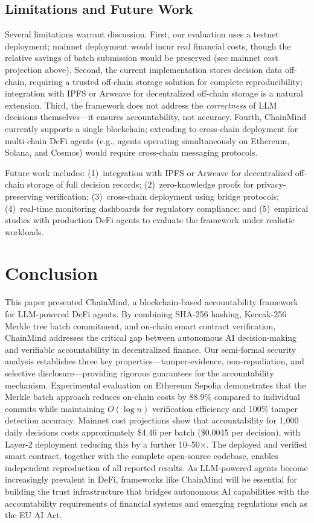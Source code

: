 \documentclass[manuscript,nonacm]{acmart}
\begin{document}
\subsection{Limitations and Future Work}

Several limitations warrant discussion.
First, our evaluation uses a testnet deployment; mainnet deployment would incur real financial costs, though the relative savings of batch submission would be preserved (see mainnet cost projection above).
Second, the current implementation stores decision data off-chain, requiring a trusted off-chain storage solution for complete reproducibility; integration with IPFS or Arweave for decentralized off-chain storage is a natural extension.
Third, the framework does not address the \emph{correctness} of LLM decisions themselves---it ensures accountability, not accuracy.
Fourth, ChainMind currently supports a single blockchain; extending to cross-chain deployment for multi-chain DeFi agents (e.g., agents operating simultaneously on Ethereum, Solana, and Cosmos) would require cross-chain messaging protocols.

Future work includes:
(1)~integration with IPFS or Arweave for decentralized off-chain storage of full decision records;
(2)~zero-knowledge proofs for privacy-preserving verification;
(3)~cross-chain deployment using bridge protocols;
(4)~real-time monitoring dashboards for regulatory compliance; and
(5)~empirical studies with production DeFi agents to evaluate the framework under realistic workloads.


\section{Conclusion}
\label{sec:conclusion}

This paper presented ChainMind, a blockchain-based accountability framework for LLM-powered DeFi agents.
By combining SHA-256 hashing, Keccak-256 Merkle tree batch commitment, and on-chain smart contract verification, ChainMind addresses the critical gap between autonomous AI decision-making and verifiable accountability in decentralized finance.
Our semi-formal security analysis establishes three key properties---tamper-evidence, non-repudiation, and selective disclosure---providing rigorous guarantees for the accountability mechanism.
Experimental evaluation on Ethereum Sepolia demonstrates that the Merkle batch approach reduces on-chain costs by 88.9\% compared to individual commits while maintaining $O(\log n)$ verification efficiency and 100\% tamper detection accuracy.
Mainnet cost projections show that accountability for 1,000 daily decisions costs approximately \$4.46 per batch (\$0.0045 per decision), with Layer-2 deployment reducing this by a further 10--50$\times$.
The deployed and verified smart contract, together with the complete open-source codebase, enables independent reproduction of all reported results.
As LLM-powered agents become increasingly prevalent in DeFi, frameworks like ChainMind will be essential for building the trust infrastructure that bridges autonomous AI capabilities with the accountability requirements of financial systems and emerging regulations such as the EU AI Act.
\end{document}
